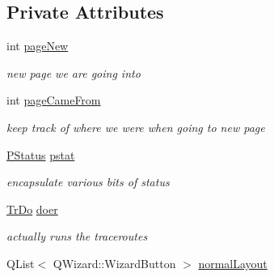 \subsection*{Private Attributes}
\begin{CompactItemize}
\item 
\hypertarget{classIXmapsWizard_0239db228bfaf9529ba77b9bc682699d}{
int \hyperlink{classIXmapsWizard_0239db228bfaf9529ba77b9bc682699d}{pageNew}}
\label{classIXmapsWizard_0239db228bfaf9529ba77b9bc682699d}

\begin{CompactList}\small\item\em new page we are going into \item\end{CompactList}\item 
\hypertarget{classIXmapsWizard_01b9783bb165bca208d3588506506ec3}{
int \hyperlink{classIXmapsWizard_01b9783bb165bca208d3588506506ec3}{pageCameFrom}}
\label{classIXmapsWizard_01b9783bb165bca208d3588506506ec3}

\begin{CompactList}\small\item\em keep track of where we were when going to new page \item\end{CompactList}\item 
\hypertarget{classIXmapsWizard_3a964f067babde8ed150b24f437c446d}{
\hyperlink{classPStatus}{PStatus} \hyperlink{classIXmapsWizard_3a964f067babde8ed150b24f437c446d}{pstat}}
\label{classIXmapsWizard_3a964f067babde8ed150b24f437c446d}

\begin{CompactList}\small\item\em encapsulate various bits of status \item\end{CompactList}\item 
\hypertarget{classIXmapsWizard_be86ebb8795a157f27021696f3545308}{
\hyperlink{classTrDo}{TrDo} \hyperlink{classIXmapsWizard_be86ebb8795a157f27021696f3545308}{doer}}
\label{classIXmapsWizard_be86ebb8795a157f27021696f3545308}

\begin{CompactList}\small\item\em actually runs the traceroutes \item\end{CompactList}\item 
\hypertarget{classIXmapsWizard_bbbbd3bb857f291c153c1a01e70bd89a}{
QList$<$ QWizard::WizardButton $>$ \hyperlink{classIXmapsWizard_bbbbd3bb857f291c153c1a01e70bd89a}{normalLayout}}
\label{classIXmapsWizard_bbbbd3bb857f291c153c1a01e70bd89a}


\end{CompactItemize}
